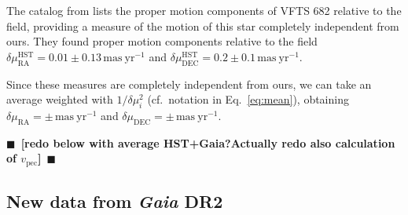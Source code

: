 \documentclass[apjl,twocolumn]{emulateapj}
\newcommand{\todo}[1]{{\large $\blacksquare$~\textbf{\color{red}[#1]}}~$\blacksquare$}
\newcommand{\kms}{{\,\mathrm{km\ s^{-1}}}}
\DeclareRobustCommand{\Eqref}[1]{Eq.~\ref{#1}}
\begin{document}

The catalog from \citet{platais:18} lists the proper motion
components of VFTS 682 relative to the field, providing a
measure of the motion of this star completely independent from
ours. They found proper
motion components relative to the field
$\delta\mu_\mathrm{RA}^\mathrm{HST} = 0.01\pm0.13\,\mathrm{mas\
  yr^{-1}}$ and
$\delta\mu_\mathrm{DEC}^\mathrm{HST}=0.2\pm0.1\,\mathrm{mas\
  yr^{-1}}$.

Since these measures are completely independent from ours, we can take
an average weighted with $1/\delta \mu_i^2$ (cf.~notation in
\Eqref{eq:mean}), obtaining $\delta\mu_\mathrm{RA}=\pm\,\mathrm{mas\
  yr^{-1}}$ and $\delta\mu_\mathrm{DEC}=\pm\,\mathrm{mas\
  yr^{-1}}$.





\todo{redo below with average HST+Gaia?Actually redo also calculation
  of $v_\mathrm{pec}$}



\subsection{New data from \emph{Gaia} DR2  \label{data:gaia}}
\end{document}
